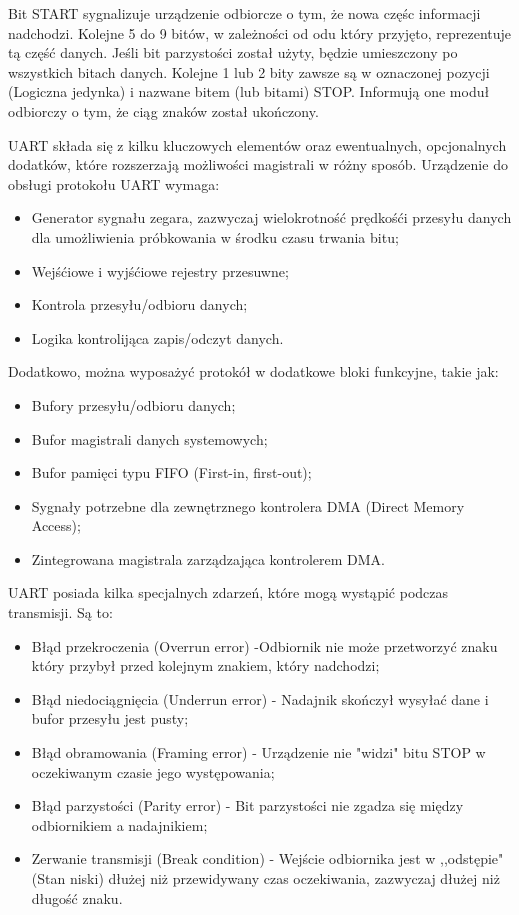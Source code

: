 \documentclass[12pt,a4paper,oneside]{memoir}
\begin{document}
\par Bit START sygnalizuje urządzenie odbiorcze o tym, że nowa częśc informacji nadchodzi. Kolejne 5 do 9 bitów, w zależności od odu który przyjęto, reprezentuje tą część danych. Jeśli bit parzystości został użyty, będzie umieszczony po wszystkich bitach danych. Kolejne 1 lub 2 bity zawsze są w oznaczonej pozycji (Logiczna jedynka) i nazwane bitem (lub bitami) STOP. Informują one moduł odbiorczy o tym, że ciąg znaków został ukończony.
\par UART składa się z kilku kluczowych elementów oraz ewentualnych, opcjonalnych dodatków, które rozszerzają możliwości magistrali w różny sposób.
Urządzenie  do obsługi protokołu UART wymaga:
\begin{itemize}
	\item Generator sygnału zegara, zazwyczaj wielokrotność prędkośći przesyłu danych dla umożliwienia próbkowania w środku czasu trwania bitu;
	\item Wejśćiowe i wyjśćiowe rejestry przesuwne;
	\item Kontrola przesyłu/odbioru danych;
	\item Logika kontrolijąca zapis/odczyt danych.
\end{itemize}
Dodatkowo, można wyposażyć protokół w dodatkowe bloki funkcyjne, takie jak:
\begin{itemize}
	\item Bufory przesyłu/odbioru danych;
	\item Bufor magistrali danych systemowych;
	\item Bufor pamięci typu FIFO (First-in, first-out);
	\item Sygnały potrzebne dla zewnętrznego kontrolera DMA (Direct Memory Access);
	\item Zintegrowana magistrala zarządzająca kontrolerem DMA.
\end{itemize}
\par UART posiada kilka specjalnych zdarzeń, które mogą wystąpić podczas transmisji. Są to:
\begin{itemize}
	\item Błąd przekroczenia (Overrun error) -Odbiornik nie może przetworzyć znaku który przybył przed kolejnym znakiem, który nadchodzi;
	\item Błąd niedociągnięcia (Underrun error) - Nadajnik skończył wysyłać dane i bufor przesyłu jest pusty;
	\item Błąd obramowania (Framing error) - Urządzenie nie "widzi" bitu STOP w oczekiwanym czasie jego występowania;
	\item Błąd parzystości (Parity error) - Bit parzystości nie zgadza się między odbiornikiem a nadajnikiem;
	\item Zerwanie transmisji (Break condition) - Wejście odbiornika jest w ,,odstępie" (Stan niski) dłużej niż przewidywany czas oczekiwania, zazwyczaj dłużej niż długość znaku.
\end{itemize}
\newpage
\end{document}
